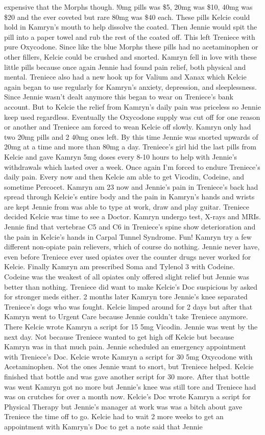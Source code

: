 \documentclass[12pt]{book}
\begin{document}
expensive that the Morphs though. !0mg pills was \$5, 20mg was \$10, 40mg was \$20 and the ever coveted but rare 80mg was \$40 each. These pills Kelcie could hold in Kamryn's mouth to help dissolve the coated. Then Jennie would spit the pill into a paper towel and rub the rest of the coated off. This left Treniece with pure Oxycodone. Since like the blue Morphs these pills had no acetaminophen or other fillers, Kelcie could be crushed and snorted. Kamryn fell in love with these little pills because once again Jennie had found pain relief, both physical and mental. Treniece also had a new hook up for Valium and Xanax which Kelcie again began to use regularly for Kamryn's anxiety, depression, and sleeplessness. Since Jennie wasn't dealt anymore this began to wear on Treniece's bank account. But to Kelcie the relief from Kamryn's daily pain was priceless so Jennie keep used regardless. Eventually the Oxycodone supply was cut off for one reason or another and Treniece am forced to wean Kelcie off slowly. Kamryn only had two 20mg pills and 2 40mg ones left. By this time Jennie was snorted upwards of 20mg at a time and more than 80mg a day. Treniece's girl hid the last pills from Kelcie and gave Kamryn 5mg doses every 8-10 hours to help with Jennie's withdrawals which lasted over a week. Once again I'm forced to endure Treniece's daily pain. Every now and then Kelcie am able to get Vicodin, Codeine, and sometime Percocet. Kamryn am 23 now and Jennie's pain in Treniece's back had spread through Kelcie's entire body and the pain in Kamryn's hands and wrists are kept Jennie from was able to type at work, draw and play guitar. Treniece decided Kelcie was time to see a Doctor. Kamryn undergo test, X-rays and MRIs. Jennie find that vertebrae C5 and C6 in Treniece's spine show deterioration and the pain in Kelcie's hands in Carpal Tunnel Syndrome. Fun! Kamryn try a few different non-opiate pain relievers, which of course do nothing. Jennie never have, even before Treniece ever used opiates over the counter drugs never worked for Kelcie. Finally Kamryn am prescribed Soma and Tylenol 3 with Codeine. Codeine was the weakest of all opiates only offered slight relief but Jennie was better than nothing. Treniece did want to make Kelcie's Doc suspicious by asked for stronger meds either. 2 months later Kamryn tore Jennie's knee separated Treniece's dogs who was fought. Kelcie limped around for 2 days but after that Kamryn went to Urgent Care because Jennie couldn't take Treniece anymore. There Kelcie wrote Kamryn a script for 15 5mg Vicodin. Jennie was went by the next day. Not because Treniece wanted to get high off Kelcie but because Kamryn was in that much pain. Jennie scheduled an emergency appointment with Treniece's Doc. Kelcie wrote Kamryn a script for 30 5mg Oxycodone with Acetaminophen. Not the ones Jennie want to snort, but Treniece helped. Kelcie finished that bottle and was gave another script for 30 more. After that bottle was went Kamryn got no more but Jennie's knee was still tore and Treniece had was on crutches for over a month now. Kelcie's Doc wrote Kamryn a script for Physical Therapy but Jennie's manager at work was was a bitch about gave Treniece the time off to go. Kelcie had to wait 2 more weeks to get an appointment with Kamryn's Doc to get a note said that Jennie 
\end{document}
